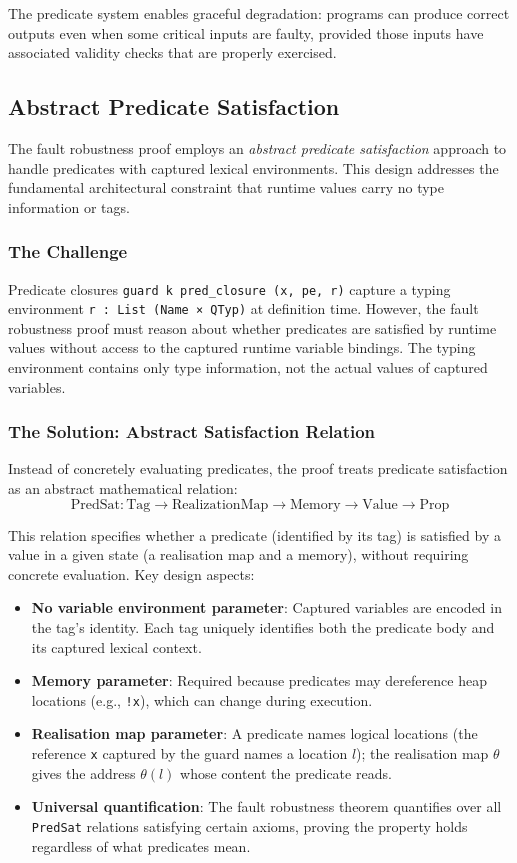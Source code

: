 \documentclass[12pt]{article}
\begin{document}
The predicate system enables graceful degradation: programs can produce correct
outputs even when some critical inputs are faulty, provided those inputs have
associated validity checks that are properly exercised.


\subsection{Abstract Predicate Satisfaction}

The fault robustness proof employs an \emph{abstract predicate satisfaction}
approach to handle predicates with captured lexical environments. This design
addresses the fundamental architectural constraint that runtime values carry no
type information or tags.

\subsubsection{The Challenge}

Predicate closures \texttt{guard k pred\_closure (x, pe, r)} capture a typing
environment \texttt{r : List (Name × QTyp)} at definition time. However, the
fault robustness proof must reason about whether predicates are satisfied by
runtime values without access to the captured runtime variable bindings. The
typing environment contains only type information, not the actual values of
captured variables.

\subsubsection{The Solution: Abstract Satisfaction Relation}

Instead of concretely evaluating predicates, the proof treats predicate satisfaction as an abstract mathematical relation:
\[
\text{PredSat} : \text{Tag} \to \text{RealizationMap} \to \text{Memory} \to \text{Value} \to \text{Prop}
\]

This relation specifies whether a predicate (identified by its tag) is satisfied
by a value in a given state (a realisation map and a memory), without requiring
concrete evaluation. Key
design aspects:

\begin{itemize}
    \item \textbf{No variable environment parameter}: Captured variables are encoded in the tag's identity. Each tag uniquely identifies both the predicate body and its captured lexical context.
    \item \textbf{Memory parameter}: Required because predicates may dereference heap locations (e.g., \texttt{!x}), which can change during execution.
    \item \textbf{Realisation map parameter}: A predicate names logical locations (the reference \texttt{x} captured by the guard names a location $l$); the realisation map $\theta$ gives the address $\theta(l)$ whose content the predicate reads.
    \item \textbf{Universal quantification}: The fault robustness theorem quantifies over all \texttt{PredSat} relations satisfying certain axioms, proving the property holds regardless of what predicates mean.
\end{itemize}
\end{document}
